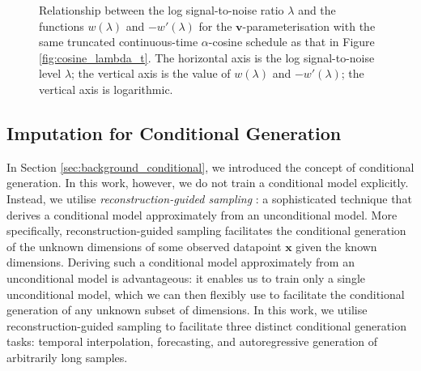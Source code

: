 \documentclass[ oneside,%
                    author={George Herbert},
                    degree={MSci},
                     title={Diffusion Models for Time-Evolving Precipitation Fields},
                  subtitle={}]{dissertation}
\begin{document}
\begin{figure}[htbp]
      \centering
      \caption{Relationship between the log signal-to-noise ratio $\lambda$ and the functions $w(\lambda)$ and $-w'(\lambda)$ for the $\mathbf{v}$-parameterisation with the same truncated continuous-time $\alpha$-cosine schedule as that in Figure \ref{fig:cosine_lambda_t}. The horizontal axis is the log signal-to-noise level $\lambda$; the vertical axis is the value of $w(\lambda)$ and $-w'(\lambda)$; the vertical axis is logarithmic.}
      \label{fig:v_prediction_weighting}
\end{figure}

\subsection{Imputation for Conditional Generation}

In Section \ref{sec:background_conditional}, we introduced the concept of conditional generation. In this work, however, we do not train a conditional model explicitly. Instead, we utilise \textit{reconstruction-guided sampling} \cite{VDM_Ho}: a sophisticated technique that derives a conditional model approximately from an unconditional model. More specifically, reconstruction-guided sampling facilitates the conditional generation of the unknown dimensions of some observed datapoint $\mathbf{x}$ given the known dimensions. Deriving such a conditional model approximately from an unconditional model is advantageous: it enables us to train only a single unconditional model, which we can then flexibly use to facilitate the conditional generation of any unknown subset of dimensions.  In this work, we utilise reconstruction-guided sampling to facilitate three distinct conditional generation tasks: temporal interpolation, forecasting, and autoregressive generation of arbitrarily long samples. 
\end{document}
